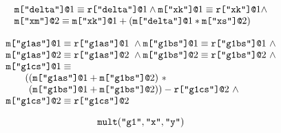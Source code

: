 $$
\begin{array}{l}
\mx{\ttt{"delta"}}{1} \eop \rx{\ttt{"delta"}}{1} \wedge
\mx{\ttt{"xk"}}{1} \eop \rx{\ttt{"xk"}}{1} \wedge\\
\mx{\ttt{"xm"}}{2} \eop \mx{\ttt{"xk"}}{1} \fplus (\mx{\ttt{"delta"}}{1} * \mx{\ttt{"xs"}}{2})
\end{array}
$$

$$
\begin{array}{l}
\mx{\ttt{"g1as"}}{1} \eop \rx{\ttt{"g1as"}}{1}\ \wedge 
\mx{\ttt{"g1bs"}}{1} \eop \rx{\ttt{"g1bs"}}{1}\ \wedge\\
\mx{\ttt{"g1as"}}{2} \eop \rx{\ttt{"g1as"}}{2}\ \wedge 
\mx{\ttt{"g1bs"}}{2} \eop \rx{\ttt{"g1bs"}}{2}\ \wedge\\
\mx{\ttt{"g1cs"}}{1} \eop \\
\qquad ((\mx{\ttt{"g1as"}}{1} \fplus \mx{\ttt{"g1bs"}}{2})\ \ftimes\\
\qquad\phantom{(}(\mx{\ttt{"g1bs"}}{1} \fplus \mx{\ttt{"g1bs"}}{2})) \fminus \rx{\ttt{"g1cs"}}{2}\ \wedge\\
\mx{\ttt{"g1cs"}}{2} \eop \rx{\ttt{"g1cs"}}{2}
\end{array}
$$

$$
\ttt{mult}(\ttt{"g1"},\ttt{"x"},\ttt{"y"})
$$

